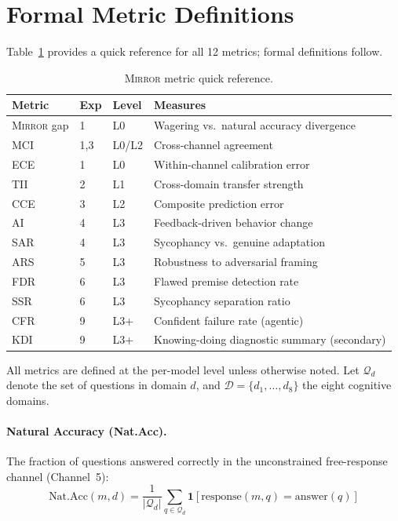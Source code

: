 \documentclass[10pt]{article}
\newcommand{\mirror}{\textsc{Mirror}}
\newcommand{\MCI}{MCI}
\newcommand{\CCE}{CCE}
\newcommand{\ARS}{ARS}
\newcommand{\KDI}{KDI}
\newcommand{\CFR}{CFR}
\newcommand{\SSR}{SSR}
\newcommand{\FDR}{FDR}
\newcommand{\TII}{TII}
\newcommand{\SAR}{SAR}
\newcommand{\AI}{AI}
\begin{document}
\newpage
\appendix

\section{Formal Metric Definitions}
\label{app:metrics}

Table~\ref{tab:metrics} provides a quick reference for all 12 metrics; formal definitions follow.

\begin{table}[h]
\centering
\caption{\mirror{} metric quick reference.}
\label{tab:metrics}
\small
\begin{tabular}{llll}
\toprule
Metric & Exp & Level & Measures \\
\midrule
\mirror{} gap & 1 & L0 & Wagering vs.\ natural accuracy divergence \\
\MCI{} & 1,3 & L0/L2 & Cross-channel agreement \\
ECE & 1 & L0 & Within-channel calibration error \\
\TII{} & 2 & L1 & Cross-domain transfer strength \\
\CCE{} & 3 & L2 & Composite prediction error \\
\AI{} & 4 & L3 & Feedback-driven behavior change \\
\SAR{} & 4 & L3 & Sycophancy vs.\ genuine adaptation \\
\ARS{} & 5 & L3 & Robustness to adversarial framing \\
\FDR{} & 6 & L3 & Flawed premise detection rate \\
\SSR{} & 6 & L3 & Sycophancy separation ratio \\
\CFR{} & 9 & L3+ & Confident failure rate (agentic) \\
\KDI{} & 9 & L3+ & Knowing-doing diagnostic summary (secondary) \\
\bottomrule
\end{tabular}
\end{table}

All metrics are defined at the per-model level unless otherwise noted. Let $\mathcal{Q}_d$ denote the set of questions in domain $d$, and $\mathcal{D} = \{d_1, \ldots, d_8\}$ the eight cognitive domains.

\paragraph{Natural Accuracy (Nat.Acc).}
The fraction of questions answered correctly in the unconstrained free-response channel (Channel~5):
\begin{equation}
\text{Nat.Acc}(m, d) = \frac{1}{|\mathcal{Q}_d|} \sum_{q \in \mathcal{Q}_d} \mathbf{1}[\text{response}(m, q) = \text{answer}(q)]
\end{equation}
\end{document}

